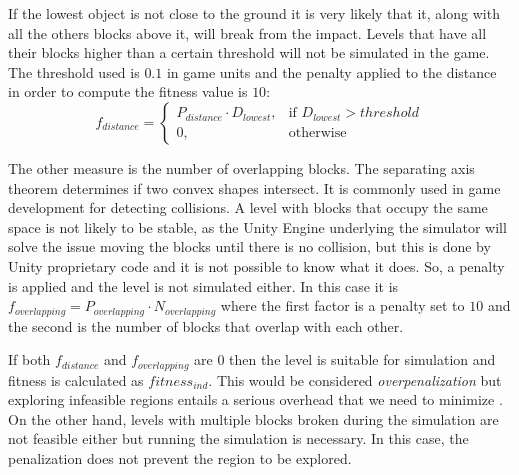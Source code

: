\documentclass[runningheads,a4paper]{llncs}
\begin{document}
If the lowest object is not close to the ground it is very likely that
it, along with all the others blocks above it, 
will break from the impact. Levels that have all their blocks higher than a 
certain threshold will not be simulated in the game. The threshold used is 
$0.1$ in game units and the penalty applied to the distance in order
to compute the fitness value is $10$:
$$f_{distance} = 
\begin{cases}
P_{distance}\cdot D_{lowest}, & \text{if } D_{lowest} > threshold\\
0, & \text{otherwise}
\end{cases}
$$



The other measure is the number of overlapping blocks. The separating axis 
theorem \cite{ericson2004real} determines if two convex shapes intersect. It is 
commonly used in game development for detecting collisions. A level with blocks 
that occupy the same space is not likely to be stable, as the Unity
Engine underlying the simulator will solve the issue moving the blocks until there is no collision, but this is done by Unity proprietary code and it is not possible to know what it does.
So, a penalty is applied and the level is not simulated either. 
In this case it is $f_{overlapping} = P_{overlapping} \cdot N_{overlapping}$ 
where the first factor is a penalty set to $10$ and the second is the number of 
blocks that overlap with each other. 

If both $f_{distance}$ and $f_{overlapping}$ are $0$ then the level is suitable 
for simulation and fitness is calculated as $fitness_{ind}$. This would be 
considered \textit{overpenalization} but exploring infeasible regions entails a 
serious overhead that we need to minimize \cite{runarsson2003evolutionary}. 
On the other hand, levels with 
multiple blocks broken during the simulation are not feasible either but 
running the simulation is necessary. In this case, the penalization does not 
prevent the region to be explored.
\end{document}
